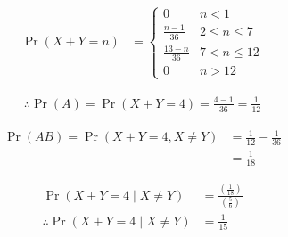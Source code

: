 \documentclass[journal,12pt,twocolumn]{IEEEtran}
\providecommand{\pr}[1]{\ensuremath{\Pr\left(#1\right)}}
\providecommand{\brak}[1]{\ensuremath{\left(#1\right)}}
\theoremstyle{remark}
\providecommand{\cond}[2]{#1\middle|#2}
\begin{document}
\begin{align}
\pr{X+Y = n} &= 
\begin{cases}
0 & n < 1
\\
\frac{n-1}{36} &  2 \le n \le  7
\\
\frac{13-n}{36} & 7 < n \le 12
\\
0 & n > 12
\end{cases}
\end{align}

\begin{align}
    \therefore \pr{A} = \pr{X+Y = 4} = \frac{4-1}{36} = \frac{1}{12}
\end{align}


\begin{align}
    \pr{AB} = \pr{X + Y = 4 , X \ne Y} &= \frac{1}{12} - \frac{1}{36}\\
                        &= \frac{1}{18}
\end{align}

\begin{align}
  \pr{\cond{X+Y = 4}{X \neq Y}} &= \frac{\brak{\frac{1}{18}}}{\brak{\frac{5}{6}}}\\
    \therefore \pr{\cond{X+Y = 4}{X \neq Y}} &= \frac{1}{15}
\end{align}
\end{document}
